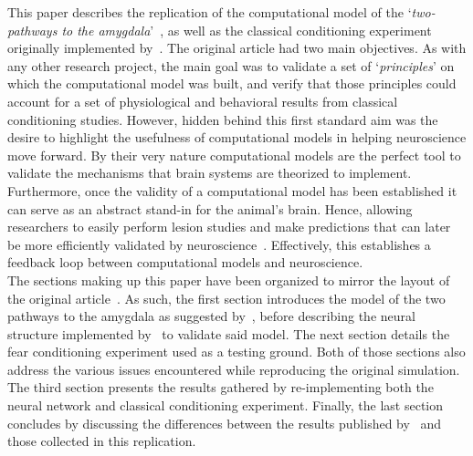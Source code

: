 This paper describes the replication of the computational model of the `\emph{two-pathways to the amygdala}'~\supercite{Ledoux1992,Romanski1992}, as well as the classical conditioning experiment originally implemented by~\citet{Armony1995}. The original article had two main objectives. As with any other research project, the main goal was to validate a set of `\emph{principles}' on which the computational model was built, and verify that those principles could account for a set of physiological and behavioral results from classical conditioning studies. However, hidden behind this first standard aim was the desire to highlight the usefulness of computational models in helping neuroscience move forward. By their very nature computational models are the perfect tool to validate the mechanisms that brain systems are theorized to implement. Furthermore, once the validity of a computational model has been established it can serve as an abstract stand-in for the animal's brain. Hence, allowing researchers to easily perform lesion studies and make predictions that can later be more efficiently validated by neuroscience~\supercite{Armony1997,Armony1997a}. Effectively, this establishes a feedback loop between computational models and neuroscience.\\

The sections making up this paper have been organized to mirror the layout of the original article~\supercite{Armony1995}. As such, the first section introduces the model of the two pathways to the amygdala as suggested by~\citet{Ledoux1992}, before describing the neural structure implemented by~\citet{Armony1995} to validate said model. The next section details the fear conditioning experiment used as a testing ground. Both of those sections also address the various issues encountered while reproducing the original simulation. The third section presents the results gathered by re-implementing both the neural network and classical conditioning experiment. Finally, the last section concludes by discussing the differences between the results published by~\citet{Armony1995} and those collected in this replication.

